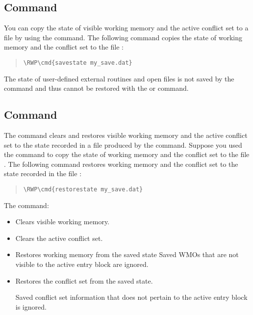 \subsection{ Command}

You can copy the state of visible working memory and the active
conflict set to a file by using the  command. The
following command copies the state of working memory and the
conflict set to the file :

\begin{quote}
\begin{Verbatim}[commandchars=\\\{\}]
\RWP\cmd{savestate my_save.dat}
\end{Verbatim}
\end{quote}  

\begin{note}
  The state of user-defined external routines and open files is not
  saved by the  command and thus cannot be restored with
  the  or  command.
\end{note}

\subsection{ Command}

The  command clears and restores visible working
memory and the active conflict set to the state recorded in a
file produced by the  command. Suppose you used the
 command to copy the state of working memory and the
conflict set to the file . The following command
restores working memory and the conflict set to the state
recorded in the file :

\begin{quote}
\begin{Verbatim}[commandchars=\\\{\}]
\RWP\cmd{restorestate my_save.dat}
\end{Verbatim}
\end{quote}

The  command:

\begin{itemize}
\item Clears visible working memory.
\item Clears the active conflict set.
\item Restores working memory from the saved state Saved WMOs that are
  not visible to the active entry block are ignored.
\item Restores the conflict set from the saved state.

  Saved conflict set information that does not pertain to the active
  entry block is ignored.
\end{itemize}

